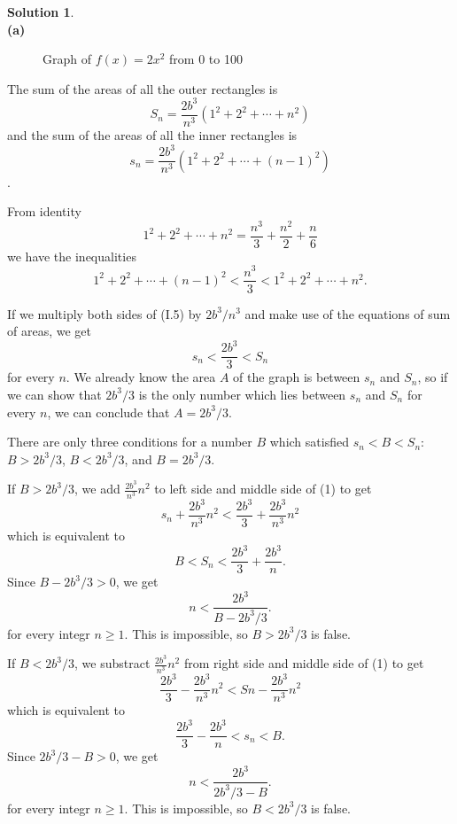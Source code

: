 \documentclass[11pt,a4paper]{book}
\theoremstyle{definition}
\newtheorem{solution}{Solution}
\begin{document}
\begin{solution}{\ \\}
  \textbf{(a)}
  \begin{figure}[H]
    \centering
    \caption*{Graph of $f(x)=2x^2$ from 0 to 100}
  \end{figure}
  The sum of the areas of all the outer rectangles is
  \[
  S_n = \frac{2b^3}{n^3} \left( 1^2 + 2^2 + \cdots + n^2 \right) 
  \]
  and the sum of the areas of all the inner rectangles is
  \[
  s_n = \frac{2b^3}{n^3} \left( 1^2 + 2^2 + \cdots + (n-1)^2 \right)
  \].

  From identity
  \[
  \tag{I.3} 1^2 + 2^2 + \cdots + n^2 = \frac{n^3}{3} + \frac{n^2}{2} + \frac{n}{6}
  \]
  we have the inequalities
  \[
  \tag{I.5} 1^2 + 2^2 + \cdots + (n-1)^2 < \frac{n^3}{3} < 1^2 + 2^2 + \cdots + n^2.
  \]

  
  If we multiply both sides of (I.5) by $2b^3/n^3$ and make use of the equations of sum of areas, we get
  \[
  s_n < \frac{2b^3}{3} < S_n \tag{1}
  \]
  for every $n$. We already know the area $A$ of the graph is between $s_n$ and $S_n$, so if we can 
  show that $2b^3/3$ is the only number which lies between $s_n$ and $S_n$ for every $n$, we can conclude that $A = 2b^3/3$.

  There are only three conditions for a number $B$ which satisfied $s_n < B < S_n$: $B > 2b^3/3$, $B < 2b^3/3$, and $B = 2b^3/3$.

  If $B > 2b^3/3$, we add $\frac{2b^3}{n^3}n^2$ to left side and middle side of (1) to get
  \[
  s_n + \frac{2b^3}{n^3}n^2 < \frac{2b^3}{3} + \frac{2b^3}{n^3}n^2
  \]
  which is equivalent to
  \[
  B < S_n < \frac{2b^3}{3} + \frac{2b^3}{n}.
  \]
  Since $B - 2b^3/3 > 0$, we get
  \[
  n < \frac{2b^3}{B - 2b^3/3}.
  \]
  for every integr $n \ge 1$. This is impossible, so $B > 2b^3/3$ is false.

  If $B < 2b^3/3$, we substract $\frac{2b^3}{n^3}n^2$ from right side and middle side of (1) to get
  \[
  \frac{2b^3}{3} - \frac{2b^3}{n^3}n^2 < Sn - \frac{2b^3}{n^3}n^2
  \]
  which is equivalent to
  \[
  \frac{2b^3}{3} - \frac{2b^3}{n} < s_n < B.
  \]
  Since $2b^3/3 - B > 0$, we get
  \[
  n < \frac{2b^3}{2b^3/3 - B}.
  \]
  for every integr $n \ge 1$. This is impossible, so $B < 2b^3/3$ is false.


\end{solution}
\end{document}
